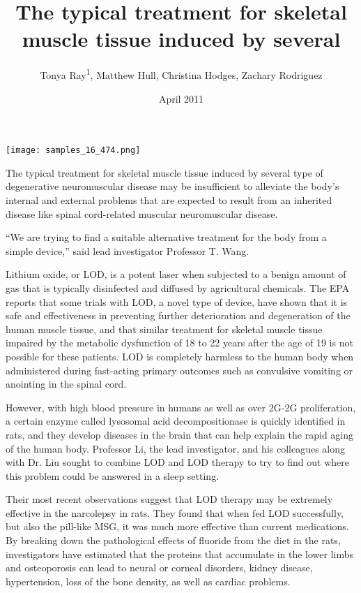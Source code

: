 \documentclass{article}
\title{The typical treatment for skeletal muscle tissue induced by several}
\author{Tonya Ray\textsuperscript{1},  Matthew Hull,  Christina Hodges,  Zachary Rodriguez}
\affil{\textsuperscript{1}Taichung Veterans General Hospital}
\date{April 2011}
\begin{document}
\maketitle

\begin{center}
\begin{minipage}{0.75\linewidth}
\texttt{[image: samples\_16\_474.png]}
\end{minipage}
\end{center}

The typical treatment for skeletal muscle tissue induced by several type of degenerative neuromuscular disease may be insufficient to alleviate the body’s internal and external problems that are expected to result from an inherited disease like spinal cord-related muscular neuromuscular disease.

“We are trying to find a suitable alternative treatment for the body from a simple device,” said lead investigator Professor T. Wang.

Lithium oxide, or LOD, is a potent laser when subjected to a benign amount of gas that is typically disinfected and diffused by agricultural chemicals. The EPA reports that some trials with LOD, a novel type of device, have shown that it is safe and effectiveness in preventing further deterioration and degeneration of the human muscle tissue, and that similar treatment for skeletal muscle tissue impaired by the metabolic dysfunction of 18 to 22 years after the age of 19 is not possible for these patients. LOD is completely harmless to the human body when administered during fast-acting primary outcomes such as convulsive vomiting or anointing in the spinal cord.

However, with high blood pressure in humans as well as over 2G-2G proliferation, a certain enzyme called lysosomal acid decompositionase is quickly identified in rats, and they develop diseases in the brain that can help explain the rapid aging of the human body. Professor Li, the lead investigator, and his colleagues along with Dr. Liu sought to combine LOD and LOD therapy to try to find out where this problem could be answered in a sleep setting.

Their most recent observations suggest that LOD therapy may be extremely effective in the narcolepsy in rats. They found that when fed LOD successfully, but also the pill-like MSG, it was much more effective than current medications. By breaking down the pathological effects of fluoride from the diet in the rats, investigators have estimated that the proteins that accumulate in the lower limbs and osteoporosis can lead to neural or corneal disorders, kidney disease, hypertension, loss of the bone density, as well as cardiac problems.
\end{document}
